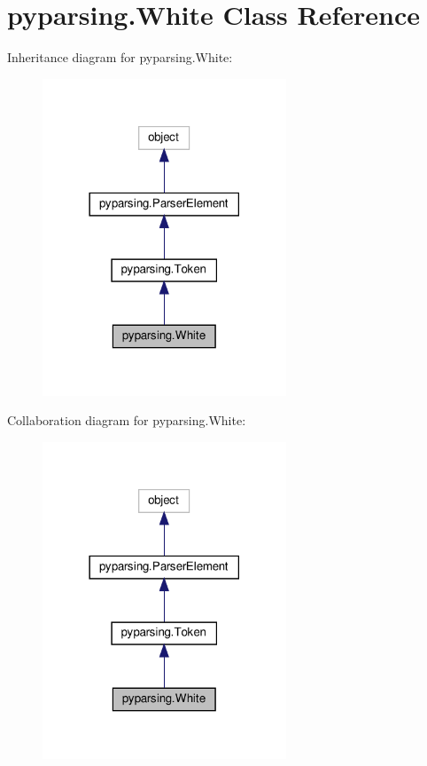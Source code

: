 \hypertarget{classpyparsing_1_1White}{}\section{pyparsing.\+White Class Reference}
\label{classpyparsing_1_1White}


Inheritance diagram for pyparsing.\+White\+:
\nopagebreak
\begin{figure}[H]
\begin{center}
\leavevmode
\includegraphics[width=206pt]{classpyparsing_1_1White__inherit__graph}
\end{center}
\end{figure}


Collaboration diagram for pyparsing.\+White\+:
\nopagebreak
\begin{figure}[H]
\begin{center}
\leavevmode
\includegraphics[width=206pt]{classpyparsing_1_1White__coll__graph}
\end{center}
\end{figure}

